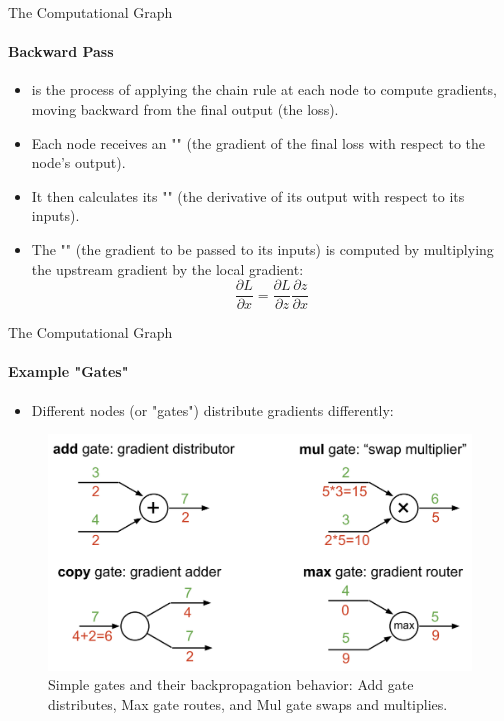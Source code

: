 \begin{frame}{The Computational Graph}
    \framesubtitle{Backward Pass}
    \begin{itemize}
        \item {} is the process of applying the chain rule at each node to compute gradients, moving backward from the final output (the loss).
        \item Each node receives an "" (the gradient of the final loss with respect to the node's output).
        \item It then calculates its "" (the derivative of its output with respect to its inputs).
        \item The "" (the gradient to be passed to its inputs) is computed by multiplying the upstream gradient by the local gradient:
        \[
            \frac{\partial L}{\partial x} = \frac{\partial L}{\partial z} \frac{\partial z}{\partial x}
        \]
    \end{itemize}
\end{frame}

\begin{frame}{The Computational Graph}
    \framesubtitle{Example "Gates"}
    \begin{itemize}
        \item Different nodes (or "gates") distribute gradients differently:
    \end{itemize}
    \begin{figure}
        \centering
        \includegraphics[width=\linewidth]{images/gradient_gates.png}
        \caption{Simple gates and their backpropagation behavior: Add gate distributes, Max gate routes, and Mul gate swaps and multiplies.}
    \end{figure}
\end{frame}